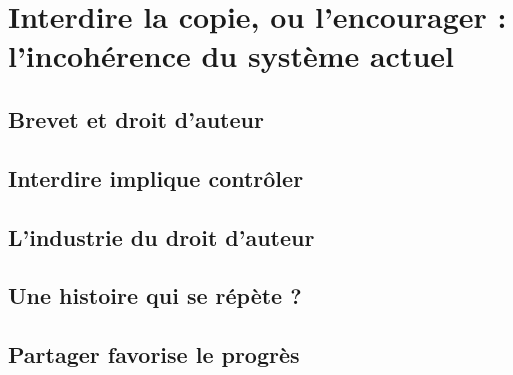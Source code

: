 \chapter{Interdire la copie, ou l'encourager : l'incohérence du système actuel}

\section{Brevet et droit d'auteur}

\section{Interdire implique contrôler}

\section{L'industrie du droit d'auteur}

\section{Une histoire qui se répète ?}

\section{Partager favorise le progrès}
